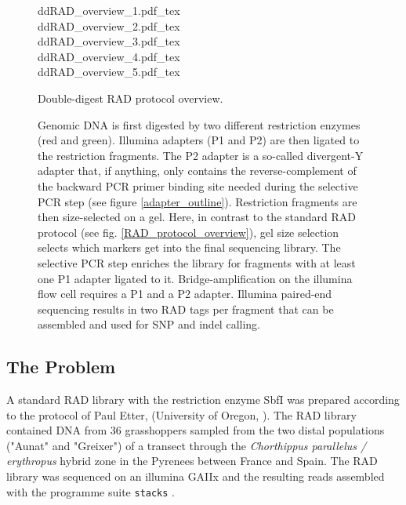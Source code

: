 \documentclass[a4paper,12pt,times,print,index, custombib]{PhDThesisPSnPDF}\usepackage[]{graphicx}\usepackage[]{color}
\begin{document}
\begin{figure}
\def\svgwidth{.9\textwidth}
{ddRAD_overview_1.pdf_tex}\\ 
\def\svgwidth{\textwidth}
{ddRAD_overview_2.pdf_tex}\\
\def\svgwidth{.9\textwidth}
{ddRAD_overview_3.pdf_tex}\\
\def\svgwidth{.9\textwidth}
{ddRAD_overview_4.pdf_tex}\\
\def\svgwidth{.9\textwidth}
{ddRAD_overview_5.pdf_tex}
\caption[Double-digest RAD protocol overview.]{Double-digest RAD protocol overview.}
\label{ddRAD_protocol_overview}
\end{figure}

\begin{figure}[t]
\ContinuedFloat
\caption[]{Genomic DNA is first digested by two different restriction enzymes (red and green). Illumina adapters (P1 and P2) are then ligated to the restriction fragments. The P2 adapter is a so-called divergent-Y adapter that, if anything, only contains the reverse-complement of the backward PCR primer binding site needed during the selective PCR step (see figure \ref{adapter_outline}). Restriction fragments are then size-selected on a gel. Here, in contrast to the standard RAD protocol (see fig. \ref{RAD_protocol_overview}), gel size selection selects which markers get into the final sequencing library. The selective PCR step enriches the library for fragments with at least one P1 adapter ligated to it. Bridge-amplification on the illumina flow cell requires a P1 and a P2 adapter. Illumina paired-end sequencing results in two RAD tags per fragment that can be assembled and used for SNP and indel calling.}
\end{figure}


\subsection{The Problem}

A standard RAD library with the restriction enzyme \gls{SbfI} was prepared according to the protocol of Paul Etter, (University of Oregon, \citealt{Baird2008}). The RAD library contained DNA from 36 grasshoppers sampled from the two distal populations ("Aunat" and "Greixer") of a transect through the \textit{Chorthippus parallelus / erythropus} hybrid zone in the Pyrenees between France and Spain. The RAD library was sequenced on an illumina GAIIx and the resulting reads assembled with the programme suite \texttt{stacks} \citep{Catchen2011}.
\end{document}
